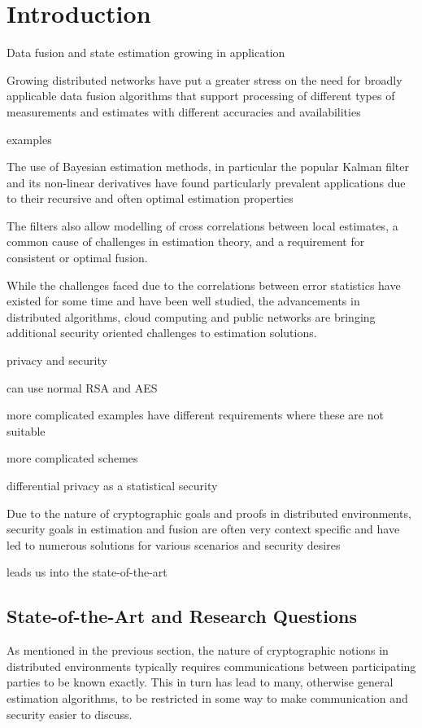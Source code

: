 
\chapter{Introduction}

Data fusion and state estimation growing in application

Growing distributed networks have put a greater stress on the need for broadly applicable data fusion algorithms that support processing of different types of measurements and estimates with different accuracies and availabilities

examples

The use of Bayesian estimation methods, in particular the popular Kalman filter and its non-linear derivatives have found particularly prevalent applications due to their recursive and often optimal estimation properties 

The filters also allow modelling of cross correlations between local estimates, a common cause of challenges in estimation theory, and a requirement for consistent or optimal fusion.

While the challenges faced due to the correlations between error statistics have existed for some time and have been well studied, the advancements in distributed algorithms, cloud computing and public networks are bringing additional security oriented challenges to estimation solutions.

privacy and security 

can use normal RSA and AES

more complicated examples have different requirements where these are not suitable

more complicated schemes

differential privacy as a statistical security

Due to the nature of cryptographic goals and proofs in distributed environments, security goals in estimation and fusion are often very context specific and have led to numerous solutions for various scenarios and security desires

leads us into the state-of-the-art


\section{State-of-the-Art and Research Questions}

As mentioned in the previous section, the nature of cryptographic notions in distributed environments typically requires communications between participating parties to be known exactly. This in turn has lead to many, otherwise general estimation algorithms, to be restricted in some way to make communication and security easier to discuss.

